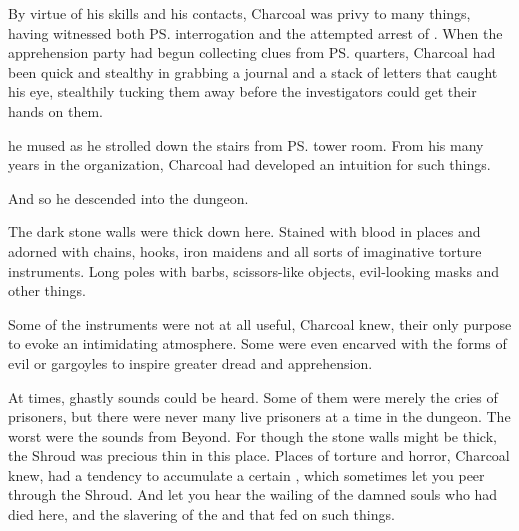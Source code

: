 \begin{comment}
\subsection{The dungeon}
\end{comment}
\begin{garbage}

%
By virtue of his skills and his contacts, Charcoal was privy to many things, having witnessed both \Constance{} \ps{\Kintaer} interrogation and the attempted arrest of \Ambrose{} \Onatol. 
When the apprehension party had begun collecting clues from \ps{\Onatol}{} quarters, Charcoal had been quick and stealthy in grabbing a journal and a stack of letters that caught his eye, stealthily tucking them away before the investigators could get their hands on them. 

 he mused as he strolled down the stairs from \ps{\Onatol}{} tower room. 
From his many years in the organization, Charcoal had developed an intuition for such things. 


And so he descended into the dungeon. 

The dark stone walls were thick down here. 
Stained with blood in places and adorned with chains, hooks, iron maidens and all sorts of imaginative torture instruments. 
Long poles with barbs, scissors-like objects, evil-looking masks and other things. 

Some of the instruments were not at all useful, Charcoal knew, their only purpose to evoke an intimidating atmosphere. 
Some were even encarved with the forms of evil \daemons{} or gargoyles to inspire greater dread and apprehension. 

At times, ghastly sounds could be heard. 
Some of them were merely the cries of prisoners, but there were never many live prisoners at a time in the dungeon. 
The worst were the sounds from Beyond. 
For though the stone walls might be thick, the Shroud was precious thin in this place. 
Places of torture and horror, Charcoal knew, had a tendency to accumulate a certain , which sometimes let you peer through the Shroud. 
And let you hear the wailing of the damned souls who had died here, and the slavering of the \daemons{} and \qliphoth{} that fed on such things. 


\end{garbage}

